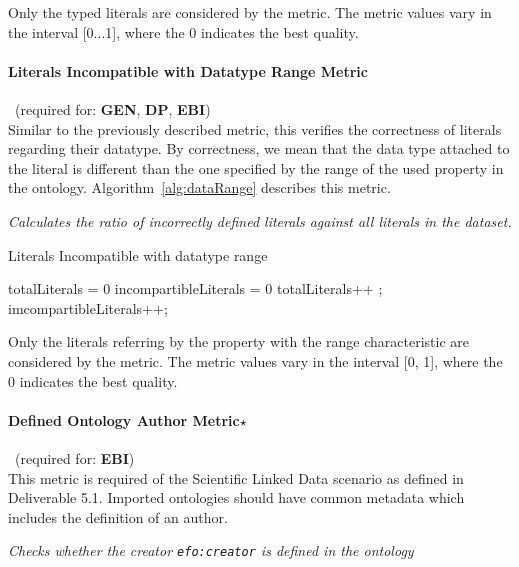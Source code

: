 Only the typed literals are considered by the metric. 
The metric values vary in the interval [0...1], where the 0 indicates the best quality.

\paragraph{Literals Incompatible with Datatype Range Metric}~(required for: \textbf{GEN}, \textbf{DP}, \textbf{EBI})~\\
Similar to the previously described metric, this verifies the correctness of literals regarding their datatype. 
By correctness, we mean that the data type attached to the literal is different than the one specified by the range of the used property in the ontology.
Algorithm~\ref{alg:dataRange} describes this metric.
\begin{mdframed}[style=metricdefinition]
\emph{Calculates the ratio of incorrectly defined literals against all literals in the dataset.}
\end{mdframed}

\begin{algorithm}
\caption{Literals Incompatible with datatype range}\label{alg:dataRange}
\begin{algorithmic}[1]
\State totalLiterals = 0
\State incompartibleLiterals = 0
\EndProcedure
{}
 totalLiterals++ ;
 imcompartibleLiterals++; 
\EndIf
\EndIf
\EndProcedure
\end{algorithmic}
\end{algorithm}

Only the literals referring by the property with the range characteristic are considered by the metric. 
The metric values vary in the interval [0, 1], where  the 0 indicates the best quality.

\paragraph{Defined Ontology Author Metric$\star$}~(required for: \textbf{EBI})~\\ 
This metric is required of the Scientific Linked Data scenario as defined in Deliverable 5.1.
Imported ontologies should have common metadata which includes the definition of an author.

\begin{mdframed}[style=metricdefinition]
\emph{Checks whether the creator \texttt{efo:creator} is defined in the ontology}
\end{mdframed}

